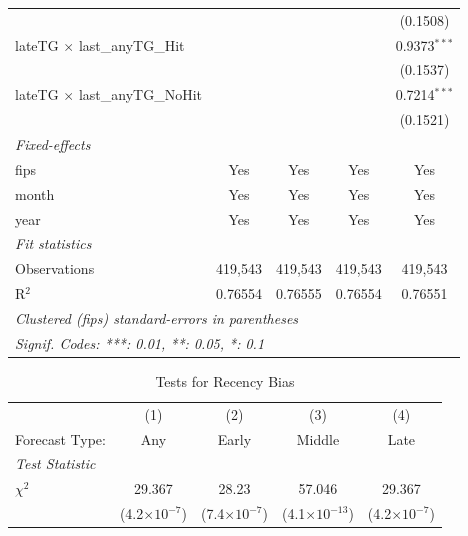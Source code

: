 \documentclass{article}
\begin{document}
\begin{appendices}
\begin{table}[htbp]
\begin{tabular}{lcccc}
                                              &                 &                 &                 & (0.1508)\\   
      lateTG $\times$ last\_anyTG\_Hit        &                 &                 &                 & 0.9373$^{***}$\\   
                                              &                 &                 &                 & (0.1537)\\   
      lateTG $\times$ last\_anyTG\_NoHit      &                 &                 &                 & 0.7214$^{***}$\\   
                                              &                 &                 &                 & (0.1521)\\   
      \midrule
      \emph{Fixed-effects}\\
      fips                                    & Yes             & Yes             & Yes             & Yes\\  
      month                                   & Yes             & Yes             & Yes             & Yes\\  
      year                                    & Yes             & Yes             & Yes             & Yes\\  
      \midrule
      \emph{Fit statistics}\\
      Observations                            & 419,543         & 419,543         & 419,543         & 419,543\\  
      R$^2$                                   & 0.76554         & 0.76555         & 0.76554         & 0.76551\\  
      \midrule \midrule
      \multicolumn{5}{l}{\emph{Clustered (fips) standard-errors in parentheses}}\\
      \multicolumn{5}{l}{\emph{Signif. Codes: ***: 0.01, **: 0.05, *: 0.1}}\\
   \end{tabular}
\end{table}



\begin{table}[htbp]
   \caption{Tests for Recency Bias}
   \centering
   \begin{tabular}{lcccc}
      \tabularnewline \midrule \midrule
       & (1) & (2) & (3) & (4)\\
      Forecast Type: & Any & Early & Middle & Late\\
      \midrule
      \emph{Test Statistic}\\
      $\chi^2$     & 29.367 &    28.23    & 57.046& 29.367    \\   
         	 &  (4.2$\times 10^{-7}$) &  (7.4$\times 10^{-7}$)  & (4.1$\times 10^{-13}$)  & (4.2$\times 10^{-7}$) \\   


\end{tabular}
\end{table}
\end{appendices}
\end{document}
